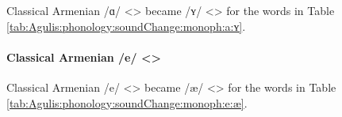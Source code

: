 Classical Armenian /ɑ/ <> became /ʏ/ <> for the words in Table \ref{tab:Agulis:phonology:soundChange:monoph:a:ʏ}. 



\begin{table}[H]
	\centering
	\caption{Change from Classical Armenian /ɑ/ <> to /ʏ/ <> in the Agulis dialect}
	\label{tab:Agulis:phonology:soundChange:monoph:a:ʏ}
\end{table}

\paragraph{Classical Armenian /e/ <>}

Classical Armenian /e/ <> became /æ/ <> for the words in Table \ref{tab:Agulis:phonology:soundChange:monoph:e:æ}. 



